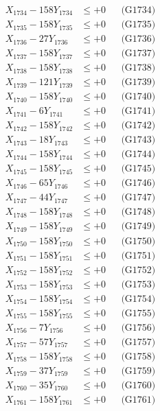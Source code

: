 \documentclass[a4paper,10pt]{article}
\begin{document}
{\begin{align}
X_{1734} - 158Y_{1734} &\leq +0 && \text{(G1734)} \\
X_{1735} - 158Y_{1735} &\leq +0 && \text{(G1735)} \\
X_{1736} - 27Y_{1736} &\leq +0 && \text{(G1736)} \\
X_{1737} - 158Y_{1737} &\leq +0 && \text{(G1737)} \\
X_{1738} - 158Y_{1738} &\leq +0 && \text{(G1738)} \\
X_{1739} - 121Y_{1739} &\leq +0 && \text{(G1739)} \\
X_{1740} - 158Y_{1740} &\leq +0 && \text{(G1740)} \\
\allowbreak
X_{1741} - 6Y_{1741} &\leq +0 && \text{(G1741)} \\
X_{1742} - 158Y_{1742} &\leq +0 && \text{(G1742)} \\
X_{1743} - 18Y_{1743} &\leq +0 && \text{(G1743)} \\
X_{1744} - 158Y_{1744} &\leq +0 && \text{(G1744)} \\
X_{1745} - 158Y_{1745} &\leq +0 && \text{(G1745)} \\
X_{1746} - 65Y_{1746} &\leq +0 && \text{(G1746)} \\
X_{1747} - 44Y_{1747} &\leq +0 && \text{(G1747)} \\
X_{1748} - 158Y_{1748} &\leq +0 && \text{(G1748)} \\
X_{1749} - 158Y_{1749} &\leq +0 && \text{(G1749)} \\
X_{1750} - 158Y_{1750} &\leq +0 && \text{(G1750)} \\
\allowbreak
X_{1751} - 158Y_{1751} &\leq +0 && \text{(G1751)} \\
X_{1752} - 158Y_{1752} &\leq +0 && \text{(G1752)} \\
X_{1753} - 158Y_{1753} &\leq +0 && \text{(G1753)} \\
X_{1754} - 158Y_{1754} &\leq +0 && \text{(G1754)} \\
X_{1755} - 158Y_{1755} &\leq +0 && \text{(G1755)} \\
X_{1756} - 7Y_{1756} &\leq +0 && \text{(G1756)} \\
X_{1757} - 57Y_{1757} &\leq +0 && \text{(G1757)} \\
X_{1758} - 158Y_{1758} &\leq +0 && \text{(G1758)} \\
X_{1759} - 37Y_{1759} &\leq +0 && \text{(G1759)} \\
X_{1760} - 35Y_{1760} &\leq +0 && \text{(G1760)} \\
\allowbreak
X_{1761} - 158Y_{1761} &\leq +0 && \text{(G1761)} \\

\end{align}}
\end{document}
